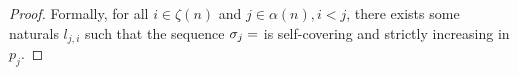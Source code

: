 \begin{proof}
  Formally, for all $i \in \zeta(n)$ and $j \in \alpha(n), i < j$, there exists some naturals $l_{j,i}$ such that the sequence
  $\seqt_j = $
  is self-covering and strictly increasing in $p_j$.
 
%
%
% 
%
%
%
%
%
%
%
%
%
%
%
%
%
%
%
%
%
%
%
%
%
%
%
%
%
%

\end{proof}
